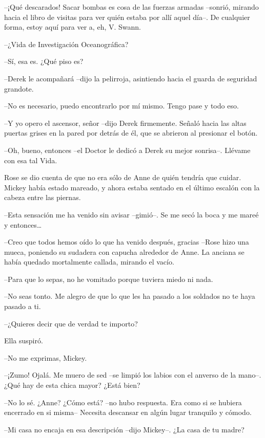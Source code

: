 {--¡Qué descarados! Sacar bombas es cosa de las fuerzas armadas
 --sonrió, mirando hacia el libro de visitas para ver quién estaba por
 allí aquel día--. De cualquier forma, estoy aquí para ver a, eh, V.
Swann.}

{--¿Vida de Investigación Oceanográfica?}

{--Sí, esa es. ¿Qué piso es?}

{--Derek le acompañará --dijo la pelirroja, asintiendo hacia el guarda
de seguridad grandote.}

{--No es necesario, puedo encontrarlo por mí mismo. Tengo pase y todo
eso.}

{--Y yo opero el ascensor, señor --dijo Derek firmemente. Señaló hacia
 las altas puertas grises en la pared por detrás de él, que se abrieron
al presionar el botón.}

{--Oh, bueno, entonces --el Doctor le dedicó a Derek su mejor sonrisa--.
Llévame con esa tal Vida.}

\mbox{}

{Rose se dio cuenta de que no era sólo de Anne de quién tendría que
 cuidar. Mickey había estado mareado, y ahora estaba sentado en el último
escalón con la cabeza entre las piernas.}

{--Esta sensación me ha venido sin avisar --gimió--. Se me secó la boca
 y me mareé y entonces\ldots{}}

{--Creo que todos hemos oído lo que ha venido después, gracias --Rose
 hizo una mueca, poniendo su sudadera con capucha alrededor de Anne. La
anciana se había quedado mortalmente callada, mirando el vacío.}

{--Para que lo sepas, no he vomitado porque tuviera miedo ni nada.}

{--No seas tonto. Me alegro de que lo que les ha pasado a los soldados
no te haya pasado a ti.}

{--¿Quieres decir que de verdad te importo?}

{Ella suspiró.}

{--No me exprimas, Mickey.}

{--¡Zumo! Ojalá. Me muero de sed --se limpió los labios con el anverso
de la mano--. ¿Qué hay de esta chica mayor? ¿Está bien?}

{--No lo sé. ¿Anne? ¿Cómo está? --no hubo respuesta. Era como si se
 hubiera encerrado en si misma-- Necesita descansar en algún lugar
tranquilo y cómodo.}

{--Mi casa no encaja en esa descripción --dijo Mickey--. ¿La casa de tu
madre?}


